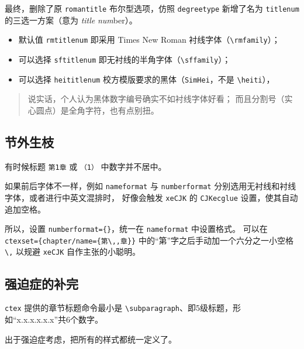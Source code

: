 \documentclass[../Main/thesis.tex]{subfiles}
\begin{document}
最终，删除了原 \texttt{romantitle} 布尔型选项，仿照 \texttt{degreetype}
新增了名为 \texttt{titlenum} 的三选一方案（意为 \emph{title}
\emph{num}ber）。

\begin{itemize}
\item
  默认值 \texttt{rmtitlenum} 即采用 Times New Roman
  衬线字体（\texttt{\textbackslash{}rmfamily}）；
\item
  可以选择 \texttt{sftitlenum}
  即无衬线的半角字体（\texttt{\textbackslash{}sffamily}）；
\item
  可以选择 \texttt{heititlenum}
  校方模版要求的黑体（\texttt{SimHei}，不是
  \texttt{\textbackslash{}heiti}），
\end{itemize}

\begin{quote}
说实话，个人认为黑体数字编号确实不如衬线字体好看；
而且分割号（实心圆点）是全角字符，也有点别扭。
\end{quote}

\subsection{节外生枝}

有时候标题 \texttt{第1章} 或 \texttt{（1）} 中数字并不居中。

如果前后字体不一样，例如 \texttt{nameformat} 与 \texttt{numberformat}
分别选用无衬线和衬线字体，或者进行中英文混排时， 好像会触发
\texttt{xeCJK} 的 \texttt{CJKecglue} 设置，使其自动追加空格。

所以，设置 \texttt{numberformat=\{\}}，统一在 \texttt{nameformat}
中设置格式。 可以在
\texttt{ctexset=\{chapter/name=\{第\textbackslash{},,章\}\}}
中的``第''字之后手动加一个六分之一小空格 \texttt{\textbackslash{},}
以规避 \texttt{xeCJK} 自作主张的小聪明。

\subsection{强迫症的补完}

\texttt{ctex} 提供的章节标题命令最小是
\texttt{\textbackslash{}subparagraph}、即5级标题，形如``x.x.x.x.x.x''共6个数字。

出于强迫症考虑，把所有的样式都统一定义了。
\end{document}
